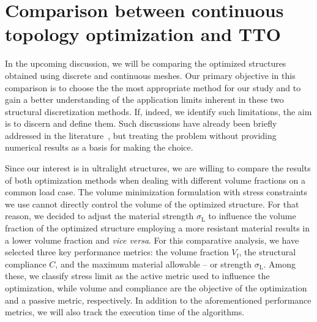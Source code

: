 \section{Comparison between continuous topology optimization and TTO} \label{sec:03_comparison}
In the upcoming discussion, we will be comparing the optimized structures obtained using discrete and continuous meshes. Our primary objective in this comparison is to choose the the most appropriate method for our study and to gain a better understanding of the application limits inherent in these two structural discretization methods. If, indeed, we identify such limitations, the aim is to discern and define them. Such discussions have already been briefly addressed in the literature~, but treating the problem without providing numerical results as a basis for making the choice.

Since our interest is in ultralight structures, we are willing to compare the results of both optimization methods when dealing with different volume fractions on a common load case. The volume minimization formulation with stress constraints we use cannot directly control the volume of the optimized structure. For that reason, we decided to adjust the material strength $\sigma_\text{L}$ to influence the volume fraction of the optimized structure \ie employing a more resistant material results in a lower volume fraction and \textit{vice versa}. For this comparative analysis, we have selected three key performance metrics: the volume fraction $V_\text{f}$, the structural compliance $C$, and the maximum material allowable -- or strength $\sigma_\text{L}$. Among these, we classify stress limit as the active metric used to influence the optimization, while volume and compliance are the objective of the optimization and a passive metric, respectively. In addition to the aforementioned performance metrics, we will also track the execution time of the algorithms.

